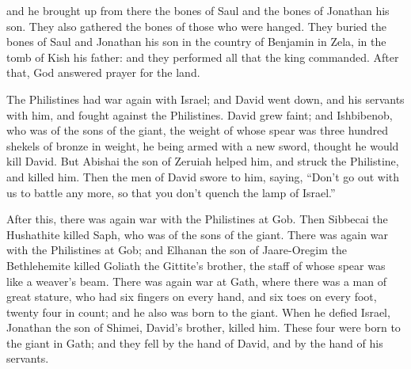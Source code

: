 {and he brought up from there the bones of Saul and the bones of Jonathan his son. They also gathered the bones of those who were hanged.
They buried the bones of Saul and Jonathan his son in the country of Benjamin in Zela, in the tomb of Kish his father: and they performed all that the king commanded. After that, God answered prayer for the land.
\par }{\PP {}The Philistines had war again with Israel; and David went down, and his servants with him, and fought against the Philistines. David grew faint;
and Ishbibenob, who was of the sons of the giant, the weight of whose spear was three hundred shekels of bronze in weight, he being armed with a new sword, thought he would kill David.
But Abishai the son of Zeruiah helped him, and struck the Philistine, and killed him. Then the men of David swore to him, saying, “Don’t go out with us to battle any more, so that you don’t quench the lamp of Israel.”
\par }{\PP {}After this, there was again war with the Philistines at Gob. Then Sibbecai the Hushathite killed Saph, who was of the sons of the giant.
There was again war with the Philistines at Gob; and Elhanan the son of Jaare-Oregim the Bethlehemite killed Goliath the Gittite’s brother, the staff of whose spear was like a weaver’s beam.
There was again war at Gath, where there was a man of great stature, who had six fingers on every hand, and six toes on every foot, twenty four in count; and he also was born to the giant.
When he defied Israel, Jonathan the son of Shimei, David’s brother, killed him.
These four were born to the giant in Gath; and they fell by the hand of David, and by the hand of his servants.

}

